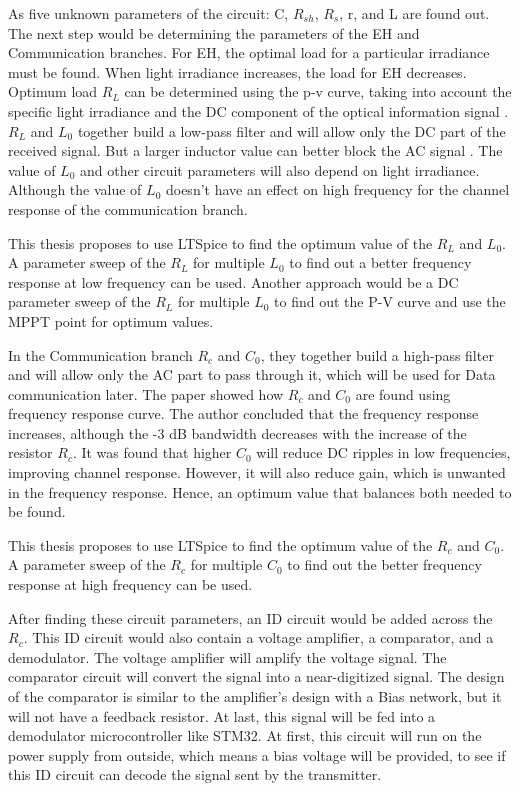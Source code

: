 As five unknown parameters of the circuit: C, \( R_{sh} \), \( R_{s} \), r, and L are found out. The next step would be determining the parameters of the \ac{EH} and Communication branches. For \ac{EH}, the optimal load for a particular irradiance must be found. When light irradiance increases, the load for \ac{EH} decreases. Optimum load \( R_{L} \) can be determined using the p-v curve, taking into account the specific light irradiance and the DC component of the optical information signal \cite{wang2015design}. \( R_{L} \) and  \( L_{0} \) together build a low-pass filter and will allow only the DC part of the received signal. But a larger inductor value can better block the AC signal \cite{wang2015design}. The value of \( L_{0} \) and other circuit parameters will also depend on light irradiance. Although the value of \( L_{0} \) doesn't have an effect on high frequency for the channel response of the communication branch\cite{wang2015design}.

This thesis proposes to use LTSpice to find the optimum value of the  \( R_{L} \) and \( L_{0} \). A parameter sweep of the \( R_{L} \) for multiple \( L_{0} \) to find out a better frequency response at low frequency can be used. Another approach would be a DC parameter sweep of the \( R_{L} \) for multiple \(L_0 \) to find out the P-V curve and use the \ac{MPPT} point for optimum values.

In the Communication branch \( R_{c} \) and \( C_{0} \), they together build a high-pass filter and will allow only the AC part to pass through it, which will be used for Data communication later. The paper \cite{wang2015design} showed how \( R_{c} \) and \( C_{0} \) are found using frequency response curve. The author concluded that the frequency response increases, although the -3 dB bandwidth decreases with the increase of the resistor \( R_{c} \). It was found that higher \( C_{0} \) will reduce DC ripples in low frequencies, improving channel response. However, it will also reduce gain, which is unwanted in the frequency response. Hence, an optimum value that balances both \cite{wang2015design} needed to be found.  

This thesis proposes to use LTSpice to find the optimum value of the  \( R_{c} \) and \( C_{0} \). A parameter sweep of the \( R_{c} \) for multiple \( C_{0} \) to find out the better frequency response at high frequency can be used. 

After finding these circuit parameters, an \ac{ID} circuit would be added across the \( R_{c} \). This \ac{ID} circuit would also contain a voltage amplifier, a comparator, and a demodulator. The voltage amplifier will amplify the voltage signal. The comparator circuit will convert the signal into a near-digitized signal. The design of the comparator is similar to the amplifier's design with a Bias network, but it will not have a feedback resistor. At last, this signal will be fed into a demodulator microcontroller like STM32. At first, this circuit will run on the power supply from outside, which means a bias voltage will be provided, to see if this \ac{ID} circuit can decode the signal sent by the transmitter. 

